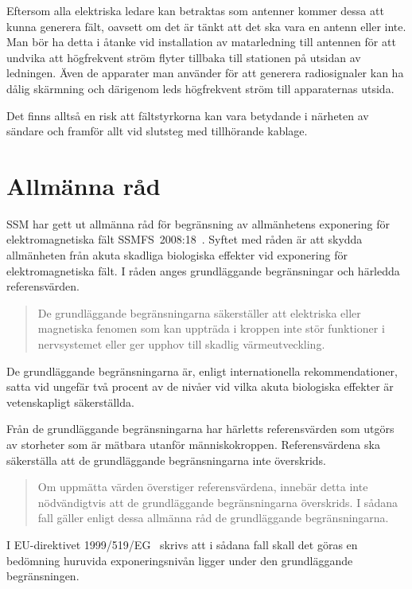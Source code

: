 Eftersom alla elektriska ledare kan betraktas som antenner kommer dessa att
kunna generera fält, oavsett om det är tänkt att det ska vara en antenn eller
inte.
Man bör ha detta i åtanke vid installation av matarledning till antennen för
att undvika att högfrekvent ström flyter tillbaka till stationen på utsidan av
ledningen.
Även de apparater man använder för att generera radiosignaler kan ha dålig
skärmning och därigenom leds högfrekvent ström till apparaternas utsida.

Det finns alltså en risk att fältstyrkorna kan vara betydande i närheten av
sändare och framför allt vid slutsteg med tillhörande kablage.

\section{Allmänna råd}

SSM har gett ut allmänna råd för begränsning av allmänhetens exponering
för elektromagnetiska fält SSMFS~2008:18~\cite{SSMFS2008:18}.
Syftet med råden är att skydda allmänheten från akuta
skadliga biologiska effekter vid exponering för elektromagnetiska fält.
I råden anges grundläggande begränsningar och härledda referensvärden.

\begin{quote}
	De grundläggande begränsningarna säkerställer att elektriska eller
	magnetiska fenomen som kan uppträda i kroppen inte stör funktioner i
	nervsystemet eller ger upphov till skadlig värmeutveckling.
\end{quote}

De grundläggande begränsningarna är, enligt internationella rekommendationer,
satta vid ungefär två procent av de nivåer vid vilka akuta biologiska effekter
är vetenskapligt säkerställda.

Från de grundläggande begränsningarna har härletts referensvärden som utgörs
av storheter som är mätbara utanför människokroppen.
Referensvärdena ska säkerställa att de grundläggande begränsningarna inte
överskrids.

\begin{quote}
	Om uppmätta värden överstiger referensvärdena, innebär detta inte nödvändigtvis
	att de grundläggande begränsningarna överskrids. I sådana fall gäller enligt
	dessa allmänna råd de grundläggande begränsningarna.
\end{quote}

\newpage

I EU-direktivet 1999/519/EG~\cite{1999/519/EG} skrivs att i sådana fall skall det
göras en bedömning huruvida exponeringsnivån ligger under den grundläggande
begränsningen.

